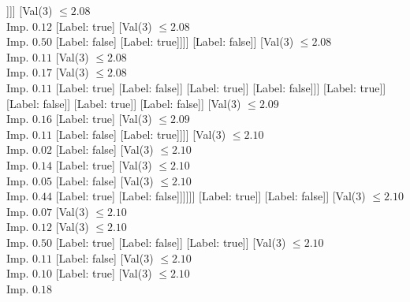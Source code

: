 \documentclass[margin=10pt]{standalone}
\begin{document}
\begin{forest}
																							[Val($3$) $ \leq 2.08$ \\ Imp. $0.22$
																								[Label: true]
																								[Label: false]]]]
																					[Val($3$) $ \leq 2.08$ \\ Imp. $0.12$
																						[Label: true]
																						[Val($3$) $ \leq 2.08$ \\ Imp. $0.50$
																							[Label: false]
																							[Label: true]]]]
																				[Label: false]]
																			[Val($3$) $ \leq 2.08$ \\ Imp. $0.11$
																				[Val($3$) $ \leq 2.08$ \\ Imp. $0.17$
																					[Val($3$) $ \leq 2.08$ \\ Imp. $0.11$
																						[Label: true]
																						[Label: false]]
																					[Label: true]]
																				[Label: false]]]
																		[Label: true]]
																	[Label: false]]
																[Label: true]]
															[Label: false]]
														[Val($3$) $ \leq 2.09$ \\ Imp. $0.16$
															[Label: true]
															[Val($3$) $ \leq 2.09$ \\ Imp. $0.11$
																[Label: false]
																[Label: true]]]]
													[Val($3$) $ \leq 2.10$ \\ Imp. $0.02$
														[Label: false]
														[Val($3$) $ \leq 2.10$ \\ Imp. $0.14$
															[Label: true]
															[Val($3$) $ \leq 2.10$ \\ Imp. $0.05$
																[Label: false]
																[Val($3$) $ \leq 2.10$ \\ Imp. $0.44$
																	[Label: true]
																	[Label: false]]]]]]
												[Label: true]]
											[Label: false]]
										[Val($3$) $ \leq 2.10$ \\ Imp. $0.07$
											[Val($3$) $ \leq 2.10$ \\ Imp. $0.12$
												[Val($3$) $ \leq 2.10$ \\ Imp. $0.50$
													[Label: true]
													[Label: false]]
												[Label: true]]
											[Val($3$) $ \leq 2.10$ \\ Imp. $0.11$
												[Label: false]
												[Val($3$) $ \leq 2.10$ \\ Imp. $0.10$
													[Label: true]
													[Val($3$) $ \leq 2.10$ \\ Imp. $0.18$

\end{forest}
\end{document}
